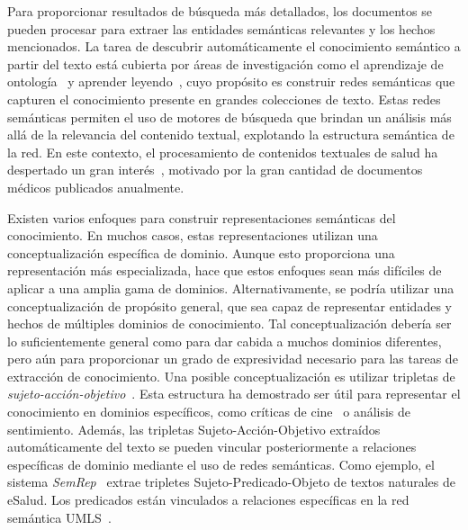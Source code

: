 Para proporcionar resultados de búsqueda más detallados, los documentos se pueden procesar para extraer las entidades semánticas relevantes y los hechos mencionados.
La tarea de descubrir automáticamente el conocimiento semántico a partir del texto está cubierta por áreas de investigación como el aprendizaje de ontología~\cite{cimiano2009ontology} y {aprender leyendo}~\cite{barker2007learning},
cuyo propósito es construir redes semánticas que {capturen} el conocimiento presente en grandes colecciones de texto.
Estas redes semánticas permiten el uso de motores de búsqueda que brindan un análisis más allá de la relevancia del contenido textual, explotando la estructura semántica de la red.
En este contexto, el procesamiento de contenidos textuales de salud ha despertado un {gran interés}~\cite{gonzalez2017capturing}, motivado por la gran cantidad de documentos médicos publicados anualmente.

Existen varios enfoques para construir representaciones semánticas del conocimiento.
En muchos casos, estas representaciones utilizan una conceptualización específica de dominio.
Aunque esto proporciona una representación más especializada, hace que estos enfoques sean más difíciles de aplicar a una amplia gama de dominios.
Alternativamente, se podría utilizar una conceptualización de propósito general, que sea capaz de representar entidades y hechos de múltiples dominios de conocimiento.
Tal conceptualización debería ser lo suficientemente general como para dar cabida a muchos dominios diferentes, pero aún para proporcionar un grado de expresividad necesario para las tareas de extracción de conocimiento.
Una posible conceptualización es utilizar tripletas de \textit{sujeto-acción-objetivo}~\cite{suilan2018}.
Esta estructura ha demostrado ser útil para representar el conocimiento en dominios específicos, como críticas de cine~\cite{suilan2018} o análisis de sentimiento.
Además, las tripletas Sujeto-Acción-Objetivo extraídos automáticamente del texto se pueden vincular posteriormente a relaciones específicas de dominio mediante el uso de redes semánticas.
Como ejemplo, el sistema \textit{SemRep}~\cite{semrep} extrae tripletes Sujeto-Predicado-Objeto de textos naturales de eSalud. Los predicados están vinculados a relaciones específicas en la red semántica UMLS~\cite{umls}.

